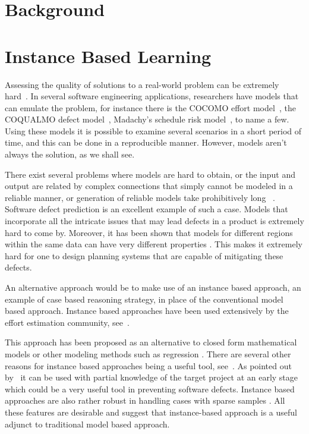 \documentclass[conference]{IEEEtran}
\begin{document}
\section{Background}
\section{Instance Based Learning}

Assessing the quality of solutions to a real-world problem can be extremely hard~\cite{menzies2005xomo}. In several software engineering applications, researchers have models that can emulate the problem, for instance there is the COCOMO effort model~\cite[p29-57]{boehm2009software}, the COQUALMO defect model~\cite[p254-268]{boehm2009software}, Madachy’s schedule risk model~\cite[p284-291]{boehm2009software}, to name a few. Using these models it is possible to examine several scenarios in a short period of time, and this can be done in a reproducible manner. However, models aren't always the solution, as we shall see. 

There exist several problems where models are hard to obtain, or the input and output are related by complex connections that simply cannot be modeled in a reliable manner, or generation of reliable models take prohibitively long ~\cite{Ludewig2003}. Software defect prediction is an excellent example of such a case. Models that incorporate all the intricate issues that may lead defects in a product is extremely hard to come by. Moreover, it has been shown that models for different regions within the same data can have very different properties \cite{localvsglobal}. This makes it extremely hard for one to design planning systems that are capable of mitigating these defects.

An alternative approach would be to make use of an instance based approach, an example of case based reasoning strategy, in place of the conventional model based approach. Instance based approaches have been used extensively by the effort estimation community, see~\cite{keung2008analogy, 6600685, walkerden1999empirical, shepperd1997estimating, kocaguneli2010use}. 

This approach has been proposed as an alternative to closed form mathematical models or other modeling methods such as regression \cite{keung2008analogy}. There are several other reasons for instance based approaches being a useful tool, see~\cite{6600685}. As pointed out by~\cite{walkerden1999empirical} it can be used with partial knowledge of the target project at an early stage which could be a very useful tool in preventing software defects. Instance based approaches are also rather robust in handling cases with sparse samples \cite{1438374}. All these features are desirable and suggest that instance-based approach is a useful adjunct to traditional model based approach. 
\end{document}

